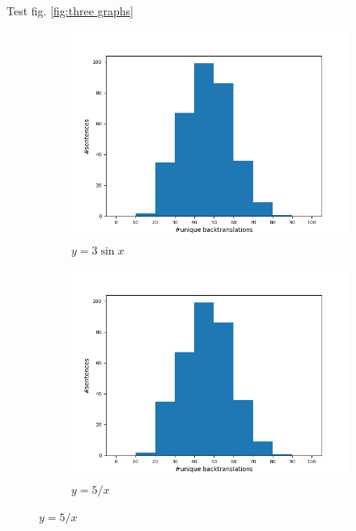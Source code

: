 
Test fig. \ref{fig:three graphs}

\begin{figure}
     \centering
     
     \begin{subfigure}{0.49\textwidth}
         \centering
         \includegraphics[width=\textwidth]{figures/unique_back_original.png}
         \caption{$y=3\sin x$}
         \label{fig:three sin x}
     \end{subfigure}
     \hfill
     \begin{subfigure}{0.49\textwidth}
         \centering
         \includegraphics[width=\textwidth]{figures/unique_back_original.png}
         \caption{$y=5/x$}

\end{subfigure}
\end{figure}
